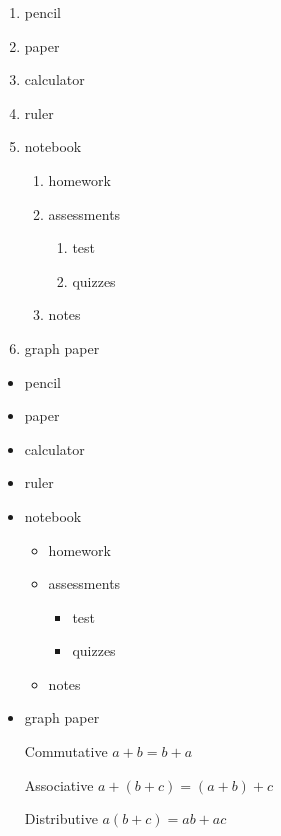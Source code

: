 \documentclass[10pt]{article}
\begin{document}
\begin{enumerate}

\item pencil
\item paper
\item calculator
\item ruler
\item notebook 
	\begin{enumerate}
	 \item homework
	 \item assessments
	 	\begin{enumerate}
	 		\item test
	 		\item quizzes
	 	\end{enumerate}
	 \item notes
	\end{enumerate}
\item graph paper

\end{enumerate}



\begin{itemize}

\item pencil
\item paper
\item calculator
\item ruler
\item notebook 
	\begin{itemize}
	
	 \item homework
	 \item assessments
	 	\begin{itemize}
	 	
	 		\item test
	 		\item quizzes
	 	\end{itemize}
	 \item notes
	\end{itemize}
\item graph paper

\end{itemize}



\begin{enumerate}

\item[Commutative] $a+b=b+a$
\item[Associative] $a+(b+c)=(a+b)+c$
\item[Distributive] $a(b+c)=ab+ac$
\end{enumerate}
\end{document}
